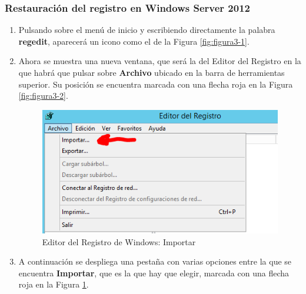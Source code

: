 \subsubsection{Restauración del registro en Windows Server 2012\cite{enlace7}}
	\begin{enumerate}
		\item Pulsando sobre el menú de inicio y escribiendo directamente la palabra \textbf{regedit}, aparecerá un icono como el de la Figura \ref{fig:figura3-1}.
		
		\item Ahora se muestra una nueva ventana, que será la del Editor del Registro en la que habrá que pulsar sobre \textbf{Archivo} ubicado en la barra de herramientas superior. Su posición se encuentra marcada con una flecha roja en la Figura \ref{fig:figura3-2}.
			\begin{figure}[H] %
				\centering
				\includegraphics[scale=0.9]{figuras/ejercicio3/figura3-6.png} 
				\caption{Editor del Registro de Windows: Importar} 
				\label{fig:figura3-6}
			\end{figure}
		\item A continuación se despliega una pestaña con varias opciones entre la que se encuentra \textbf{Importar}, que es la que hay que elegir, marcada con una flecha roja en la Figura \ref{fig:figura3-6}.
		

\end{enumerate}
